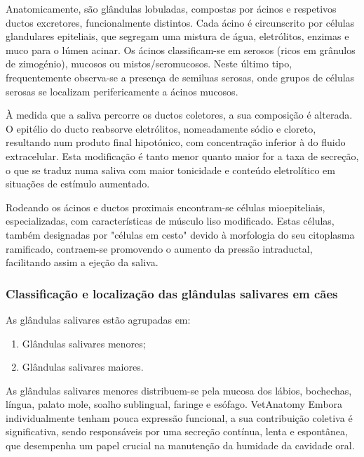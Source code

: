 Anatomicamente, são glândulas lobuladas, compostas por ácinos e respetivos ductos excretores, funcionalmente distintos. Cada ácino é circunscrito por células glandulares epiteliais, que segregam uma mistura de água, eletrólitos, enzimas e muco para o lúmen acinar. \cite{Proctor2007,cunningham} Os ácinos classificam-se em serosos (ricos em grânulos de zimogénio), mucosos ou mistos/seromucosos.\cite{cunningham} Neste último tipo, frequentemente observa-se a presença de semiluas serosas, onde grupos de células serosas se localizam perifericamente a ácinos mucosos.\cite{Das_Textbook,cunningham} 

À medida que a saliva percorre os ductos coletores, a sua composição é alterada. \cite{Proctor2007,cunningham} O epitélio do ducto reabsorve eletrólitos, nomeadamente sódio e cloreto, resultando num produto final hipotónico, com concentração inferior à do fluido extracelular. Esta modificação é tanto menor quanto maior for a taxa de secreção, o que se traduz numa saliva com maior tonicidade e conteúdo eletrolítico em situações de estímulo aumentado. \cite{cunningham} 

Rodeando os ácinos e ductos proximais encontram-se células mioepiteliais, especializadas, com características de músculo liso modificado.\cite{cunningham} Estas células, também designadas por "células em cesto" devido à morfologia do seu citoplasma ramificado, contraem-se promovendo o aumento da pressão intraductal, facilitando assim a ejeção da saliva. \cite{Das_Textbook,cunningham}

\subsubsection{Classificação e localização das glândulas salivares em cães}

As glândulas salivares estão agrupadas em:
\begin{enumerate}
    \item	Glândulas salivares menores;
    \item Glândulas salivares maiores.
\end{enumerate}

As glândulas salivares menores distribuem-se pela mucosa dos lábios, bochechas, língua, palato mole, soalho sublingual, faringe e esófago. \cite{Singh2017}VetAnatomy Embora individualmente tenham pouca expressão funcional, a sua contribuição coletiva é significativa,\cite{Singh2017} sendo responsáveis por uma secreção contínua, lenta e espontânea, que desempenha um papel crucial na manutenção da humidade da cavidade oral. \cite{Cappai2021}

